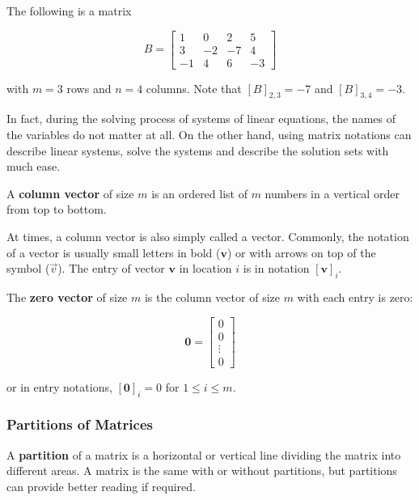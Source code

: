 \documentclass[a4paper,12pt]{article}
\begin{document}
\begin{exm}
  The following is a matrix

  $$B=\begin{bmatrix}
  1 & 0 & 2 & 5\\
  3 & -2 & -7 & 4\\
  -1 & 4 & 6 & -3
  \end{bmatrix}$$\s

  with $m=3$ rows and $n=4$ columns. Note that $[B]_{2,3}=-7$ and $[B]_{3,4}=-3$.
\end{exm}\n

In fact, during the solving process of systems of linear equations, the names of the variables do not matter at all. On the other hand, using matrix notations can describe linear systems, solve the systems and describe the solution sets with much ease.\n

\begin{dft}
  A \textbf{column vector} of size $m$ is an ordered list of $m$ numbers in a vertical order from top to bottom.
\end{dft}\n

At times, a column vector is also simply called a vector. Commonly, the notation of a vector is usually small letters in bold ($\mathbf{v}$) or with arrows on top of the symbol ($\vec{v}$). The entry of vector $\mathbf{v}$ in location $i$ is in notation $[\mathbf{v}]_{i}$.\n

\begin{dft}
  The \textbf{zero vector} of size $m$ is the column vector of size $m$ with each entry is zero:

  $$\mathbf{0}=\begin{bmatrix}
  0\\
  0\\
  \vdots\\
  0
  \end{bmatrix}$$\s

  or in entry notations, $[\mathbf{0}]_{i}=0$ for $1\leq i\leq m$.
\end{dft}

\propdisp

\subsubsection{Partitions of Matrices}
\begin{dft}
  A \textbf{partition} of a matrix is a horizontal or vertical line dividing the matrix into different areas. A matrix is the same with or without partitions, but partitions can provide better reading if required.
\end{dft}\n
\end{document}

